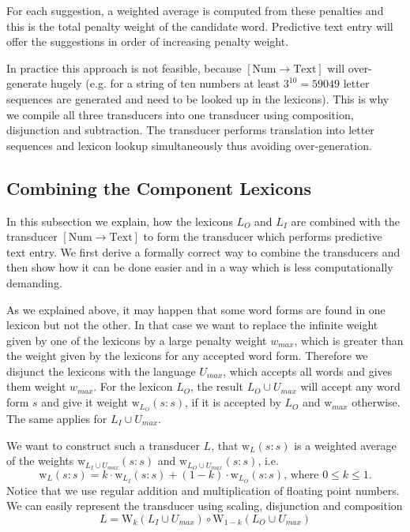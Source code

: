 \documentclass[a4paper,conference]{IEEEtran}
\begin{document}
For each suggestion, a weighted average is computed from these
penalties and this is the total penalty weight of the candidate
word. Predictive text entry will offer the suggestions in order of
increasing penalty weight.

In practice this approach is not feasible, because
$[\mathrm{Num}\rightarrow\mathrm{Text}]$ will over-generate hugely
(e.g. for a string of ten numbers at least $3^{10} = 59049$ letter
sequences are generated and need to be looked up in the
lexicons). This is why we compile all three transducers into one
transducer using composition, disjunction and subtraction. The
transducer performs translation into letter sequences and lexicon
lookup simultaneously thus avoiding over-generation.

\subsection{Combining the Component Lexicons}

In this subsection we explain, how the lexicons $L_O$ and $L_I$ are
combined with the transducer $[\mathrm{Num}\rightarrow\mathrm{Text}]$
to form the transducer which performs predictive text entry. We first
derive a formally correct way to combine the transducers and then show
how it can be done easier and in a way which is less computationally
demanding.

As we explained above, it may happen that some word forms are found in
one lexicon but not the other. In that case we want to replace the
infinite weight given by one of the lexicons by a large penalty weight
$w_{max}$, which is greater than the weight given by the lexicons for
any accepted word form. Therefore we disjunct the lexicons with the
language $U_{max}$, which accepts all words and gives them weight
$w_{max}$. For the lexicon $L_O$, the result $L_O \cup U_{max}$ will
accept any word form $s$ and give it weight
$\mathrm{w}_{L_O}(s\mathrm{:}s)$, if it is accepted by $L_O$ and
$\mathrm{w}_{max}$ otherwise. The same applies for $L_I \cup U_{max}$.

We want to construct such a transducer $L$, that $\mathrm{w}_L(s\mathrm{:}s)$
is a weighted average of the weights $\mathrm{w}_{L_I \cup U_{max}}(s\mathrm{:}s)$ and
$\mathrm{w}_{L_O \cup U_{max}}(s\mathrm{:}s)$, i.e.
\begin{equation}
  \mathrm{w}_L(s\mathrm{:}s) = k\cdot \mathrm{w}_{L_I}(s\mathrm{:}s) + (1 - k)\cdot \mathrm{w}_{L_O}(s\mathrm{:}s)\text{, where }0\leq k \leq 1\text{.}
\end{equation}
Notice that we use regular addition and multiplication of floating
point numbers. We can easily represent the transducer using scaling, disjunction and composition
\begin{equation}
  L = \mathrm{W}_k(L_I \cup U_{max}) \circ \mathrm{W}_{1-k}(L_O \cup U_{max})
\end{equation}
\end{document}
